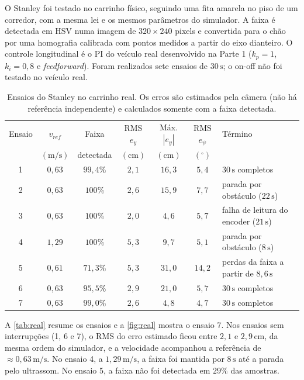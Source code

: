 O Stanley foi testado no carrinho físico, seguindo uma fita amarela no piso de um corredor, com a mesma lei e os mesmos parâmetros do simulador. A faixa é detectada em HSV numa imagem de $320\times240$ pixels e convertida para o chão por uma homografia calibrada com pontos medidos a partir do eixo dianteiro. O controle longitudinal é o PI do veículo real desenvolvido na Parte 1 ($k_p=1$, $k_i=0{,}8$ e \textit{feedforward}). Foram realizados sete ensaios de $30\,\mathrm{s}$; o on-off não foi testado no veículo real.

\begin{table}[ht]
    \centering
    \caption{Ensaios do Stanley no carrinho real. Os erros são estimados pela câmera (não há referência independente) e calculados somente com a faixa detectada.}
    \label{tab:real}
    \small
    \setlength{\tabcolsep}{3.5pt}
    \begin{tabular}{ccccccl}
        \hline
        Ensaio & $v_{ref}$ & Faixa & RMS $e_y$ & Máx. $|e_y|$ & RMS $e_\psi$ & Término \\
        & $(\mathrm{m/s})$ & detectada & $(\mathrm{cm})$ & $(\mathrm{cm})$ & $(^\circ)$ & \\
        \hline
        1 & $0{,}63$ & $99{,}4\%$ & $2{,}1$ & $16{,}3$ & $5{,}4$ & $30\,\mathrm{s}$ completos \\
        2 & $0{,}63$ & $100\%$ & $2{,}6$ & $15{,}9$ & $7{,}7$ & parada por obstáculo ($22\,\mathrm{s}$) \\
        3 & $0{,}63$ & $100\%$ & $2{,}0$ & $4{,}6$ & $5{,}7$ & falha de leitura do encoder ($21\,\mathrm{s}$) \\
        4 & $1{,}29$ & $100\%$ & $5{,}3$ & $9{,}7$ & $5{,}1$ & parada por obstáculo ($8\,\mathrm{s}$) \\
        5 & $0{,}61$ & $71{,}3\%$ & $5{,}3$ & $31{,}0$ & $14{,}2$ & perdas da faixa a partir de $8{,}6\,\mathrm{s}$ \\
        6 & $0{,}63$ & $95{,}5\%$ & $2{,}9$ & $21{,}0$ & $5{,}7$ & $30\,\mathrm{s}$ completos \\
        7 & $0{,}63$ & $99{,}0\%$ & $2{,}6$ & $4{,}8$ & $4{,}7$ & $30\,\mathrm{s}$ completos \\
        \hline
    \end{tabular}
\end{table}

A \autoref{tab:real} resume os ensaios e a \autoref{fig:real} mostra o ensaio 7. Nos ensaios sem interrupções (1, 6 e 7), o RMS do erro estimado ficou entre $2{,}1$ e $2{,}9\,\mathrm{cm}$, da mesma ordem do simulador, e a velocidade acompanhou a referência de $\approx0{,}63\,\mathrm{m/s}$. No ensaio 4, a $1{,}29\,\mathrm{m/s}$, a faixa foi mantida por $8\,\mathrm{s}$ até a parada pelo ultrassom. No ensaio 5, a faixa não foi detectada em $29\%$ das amostras.

